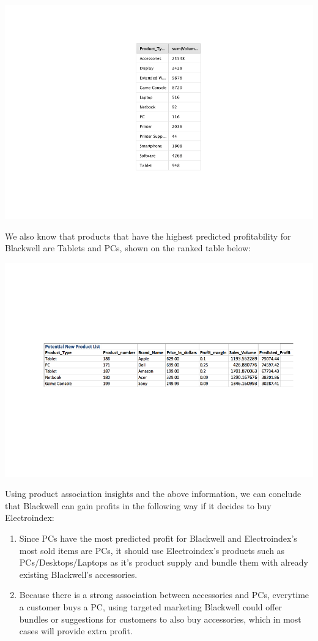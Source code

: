 \documentclass[]{article}
\begin{document}
\includegraphics{markdown_report_files/figure-latex/pic1-1.pdf}

We also know that products that have the highest predicted profitability
for Blackwell are Tablets and PCs, shown on the ranked table below:

\includegraphics{markdown_report_files/figure-latex/pic2-1.pdf}

Using product association insights and the above information, we can
conclude that Blackwell can gain profits in the following way if it
decides to buy Electroindex:

\begin{enumerate}
\def\labelenumi{\arabic{enumi})}
\item
  Since PCs have the most predicted profit for Blackwell and
  Electroindex's most sold items are PCs, it should use Electroindex's
  products such as PCs/Desktops/Laptops as it's product supply and
  bundle them with already existing Blackwell's accessories.
\item
  Because there is a strong association between accessories and PCs,
  everytime a customer buys a PC, using targeted marketing Blackwell
  could offer bundles or suggestions for customers to also buy
  accessories, which in most cases will provide extra profit.
\end{enumerate}
\end{document}
